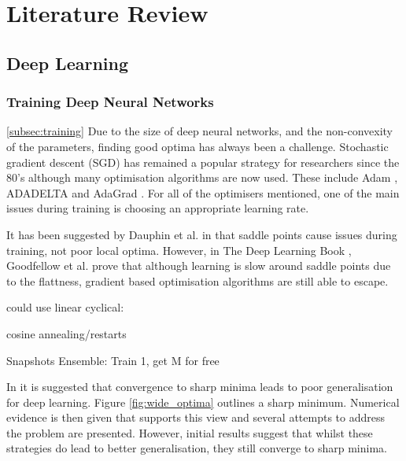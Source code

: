 
\chapter{Literature Review}\label{cha:literature}

\section{Deep Learning}\label{sec:deep_learning_lit}

\subsection{Training Deep Neural Networks}\ref{subsec:training}
Due to the size of deep neural networks, and the non-convexity of the parameters, finding good optima has always been a challenge.
Stochastic gradient descent (SGD) has remained a popular strategy for researchers since the 80's although many optimisation algorithms are now used.
These include Adam \cite{Kingma_Ba_2014}, ADADELTA \cite{Zeiler_2012} and AdaGrad \cite{Duchi_Hazan_Singer_2011}.
For all of the optimisers mentioned, one of the main issues during training is choosing an appropriate learning rate.

It has been suggested by Dauphin et al. in \cite{Dauphin_de_Vries_Bengio_2015} that saddle points cause issues during training, not poor local optima.
However, in The Deep Learning Book \cite{Goodfellow-et-al-2016}, Goodfellow et al. prove that although learning is slow around saddle points due to the flattness, gradient based optimisation algorithms are still able to escape.

could use linear cyclical: \cite{Smith_2015}

cosine annealing/restarts \cite{Loshchilov_Hutter_2016}

Snapshots Ensemble: Train 1, get M for free \cite{Huang_Li_Pleiss_Liu_Hopcroft_Weinberger_2017}

In \cite{Keskar_Mudigere_Nocedal_Smelyanskiy_Tang_2016} it is suggested that convergence to sharp minima leads to poor generalisation for deep learning.
Figure \ref{fig:wide_optima} outlines a sharp minimum.
Numerical evidence is then given that supports this view and several attempts to address the problem are presented.
However, initial results suggest that whilst these strategies do lead to better generalisation, they still converge to sharp minima.

